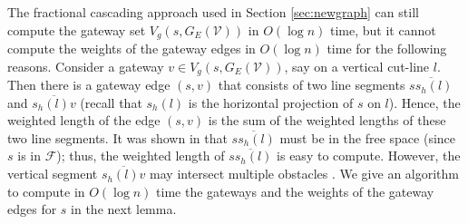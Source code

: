 \documentclass[english,runningheads,11pt]{llncs}
\def\calF{\mathcal{F}}
\def\calV{\mathcal{V}}
\begin{document}
The fractional cascading approach \cite{ref:ChazelleFr86} used in
Section \ref{sec:newgraph} can still compute the gateway
set $V_g(s,G_E(\calV))$ in $O(\log n)$ time, but it cannot compute the weights of the
gateway edges in $O(\log n)$ time for the following reasons.
Consider a gateway $v\in V_g(s,G_E(\calV))$, say on a vertical cut-line $l$. Then
there is a gateway edge $(s,v)$ that consists of two line segments
$\overline{ss_h(l)}$ and $\overline{s_h(l)v}$ (recall that $s_h(l)$ is the horizontal projection of $s$ on $l$). Hence, the weighted length
of the edge $(s,v)$ is the sum of the weighted lengths of these two line segments.
It was shown in \cite{ref:ChenSh00} that $\overline{ss_h(l)}$ must be in the free
space (since $s$ is in $\calF$); thus, the weighted length of
$\overline{ss_h(l)}$ is easy to compute. However, the vertical segment
$\overline{s_h(l)v}$ may intersect multiple
obstacles \cite{ref:ChenSh00}. We give an algorithm to compute in
$O(\log n)$ time the gateways and the weights of the
gateway edges for $s$ in the next lemma.
\end{document}
